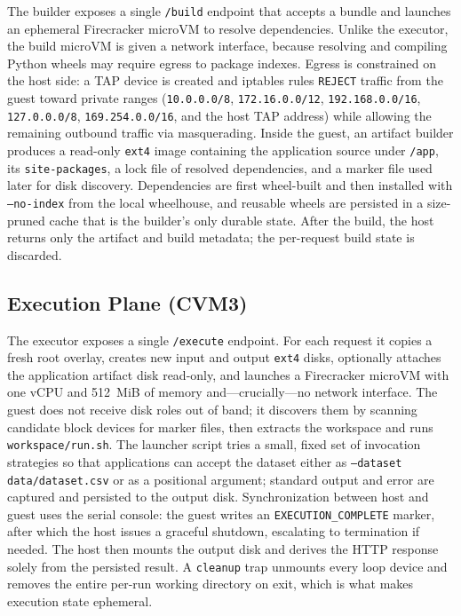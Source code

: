 The builder exposes a single \texttt{/build} endpoint that accepts a bundle and
launches an ephemeral Firecracker microVM to resolve dependencies. Unlike the
executor, the build microVM is given a network interface, because resolving and
compiling Python wheels may require egress to package indexes. Egress is
constrained on the host side: a TAP device is created and iptables rules
\texttt{REJECT} traffic from the guest toward private ranges
(\texttt{10.0.0.0/8}, \texttt{172.16.0.0/12}, \texttt{192.168.0.0/16},
\texttt{127.0.0.0/8}, \texttt{169.254.0.0/16}, and the host TAP address) while
allowing the remaining outbound traffic via masquerading. Inside the guest, an
artifact builder produces a read-only \texttt{ext4} image containing the
application source under \texttt{/app}, its \texttt{site-packages}, a lock file of
resolved dependencies, and a marker file used later for disk discovery.
Dependencies are first wheel-built and then installed with \texttt{--no-index}
from the local wheelhouse, and reusable wheels are persisted in a size-pruned
cache that is the builder's only durable state. After the build, the host returns
only the artifact and build metadata; the per-request build state is discarded.

\subsection{Execution Plane (CVM3)}

The executor exposes a single \texttt{/execute} endpoint. For each request it
copies a fresh root overlay, creates new input and output \texttt{ext4} disks,
optionally attaches the application artifact disk read-only, and launches a
Firecracker microVM with one vCPU and 512~MiB of memory and---crucially---no
network interface. The guest does not receive disk roles out of band; it
discovers them by scanning candidate block devices for marker files, then
extracts the workspace and runs \texttt{workspace/run.sh}. The launcher script
tries a small, fixed set of invocation strategies so that applications can accept
the dataset either as \texttt{--dataset data/dataset.csv} or as a positional
argument; standard output and error are captured and persisted to the output
disk. Synchronization between host and guest uses the serial console: the guest
writes an \texttt{EXECUTION\_COMPLETE} marker, after which the host issues a
graceful shutdown, escalating to termination if needed. The host then mounts the
output disk and derives the HTTP response solely from the persisted result. A
\texttt{cleanup} trap unmounts every loop device and removes the entire per-run
working directory on exit, which is what makes execution state ephemeral.

